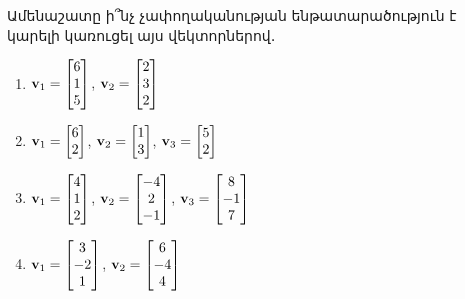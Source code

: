 \begin{problem}
Ամենաշատը ի՞նչ չափողականության ենթատարածություն է կարելի կառուցել այս վեկտորներով․
\begin{enumerate}[label={\alph*}․]
\item $\mathbf{v}_1=\begin{bmatrix}6\\1\\5\end{bmatrix}$,  $\mathbf{v}_2=\begin{bmatrix}
    2\\3\\2
\end{bmatrix}$

\item $\mathbf{v}_1=\begin{bmatrix}6\\2\end{bmatrix}$,  $\mathbf{v}_2=\begin{bmatrix}
    1\\3
\end{bmatrix}$,  $\mathbf{v}_3=\begin{bmatrix}
    5\\2
\end{bmatrix}$

\item $\mathbf{v}_1=\begin{bmatrix}4\\1\\2\end{bmatrix}$,  $\mathbf{v}_2=\begin{bmatrix}
    -4\\2\\-1
\end{bmatrix}$,  $\mathbf{v}_3=\begin{bmatrix}
    8\\-1\\7
\end{bmatrix}$

\item $\mathbf{v}_1=\begin{bmatrix}3\\-2\\1\end{bmatrix}$, $ \mathbf{v}_2=\begin{bmatrix}
    6\\-4\\4
\end{bmatrix}$
\end{enumerate}
\end{problem}



